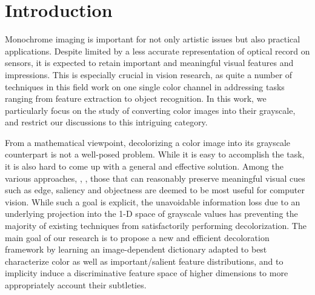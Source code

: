 \section{Introduction}
\label{sec:intro}

Monochrome imaging is important for not only artistic issues 
but also practical applications. 
Despite limited by a less accurate representation of optical
record on sensors, it is expected to retain important and
meaningful visual features and impressions.  
This is especially crucial in vision research, 
as quite a number of techniques in this field work on 
one single color channel in addressing tasks ranging from 
feature extraction to object recognition. 
In this work, we particularly focus on the study of converting
color images into their grayscale, and restrict our discussions to this intriguing category.

From a mathematical viewpoint, decolorizing a color image into
its grayscale counterpart is not a well-posed problem. 
While it is easy to accomplish the task, it is also hard to 
come up with a general and effective solution. 
Among the various approaches, \eg, \cite{Gooch:2005:CSC,Lau:2011:CBC,Ancuti:2011:ESG},
those that can reasonably preserve meaningful visual cues such as edge,
saliency and objectness are deemed to be most useful for computer vision.
While such a goal is explicit, the unavoidable information loss due to 
an underlying projection into the 1-D space of grayscale values has 
preventing the majority of existing techniques from satisfactorily 
performing decolorization. 
The main goal of our research is to propose a new and efficient 
decoloration framework by learning an image-dependent dictionary 
adapted to best characterize color as well as important/salient feature distributions,
and to implicity induce a discriminative feature space of 
higher dimensions to more appropriately account their subtleties.

